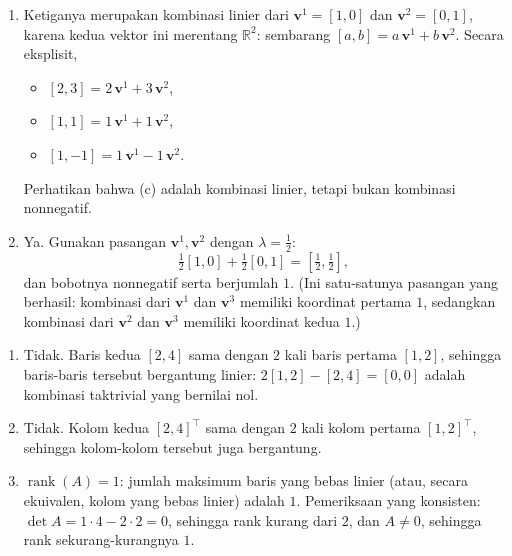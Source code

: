 \begin{enumerate}
\item Ketiganya merupakan kombinasi linier dari $\mathbf{v}^1 = [1,0]$ dan $\mathbf{v}^2 = [0,1]$, karena kedua vektor ini merentang $\mathbb{R}^2$: sembarang $[a, b] = a\,\mathbf{v}^1 + b\,\mathbf{v}^2$. Secara eksplisit,
\begin{itemize}
\item[(a)] $[2,3] = 2\,\mathbf{v}^1 + 3\,\mathbf{v}^2$,
\item[(b)] $[1,1] = 1\,\mathbf{v}^1 + 1\,\mathbf{v}^2$,
\item[(c)] $[1,-1] = 1\,\mathbf{v}^1 - 1\,\mathbf{v}^2$.
\end{itemize}
Perhatikan bahwa (c) adalah kombinasi linier, tetapi bukan kombinasi nonnegatif.
\item Ya. Gunakan pasangan $\mathbf{v}^1, \mathbf{v}^2$ dengan $\lambda = \tfrac12$:
\[
\tfrac12 [1, 0] + \tfrac12 [0, 1] = [\tfrac12, \tfrac12],
\]
dan bobotnya nonnegatif serta berjumlah $1$. (Ini satu-satunya pasangan yang berhasil: kombinasi dari $\mathbf{v}^1$ dan $\mathbf{v}^3$ memiliki koordinat pertama $1$, sedangkan kombinasi dari $\mathbf{v}^2$ dan $\mathbf{v}^3$ memiliki koordinat kedua $1$.)
\end{enumerate}

\begin{enumerate}
\item Tidak. Baris kedua $[2,4]$ sama dengan $2$ kali baris pertama $[1,2]$, sehingga baris-baris tersebut bergantung linier: $2[1,2] - [2,4] = [0,0]$ adalah kombinasi taktrivial yang bernilai nol.
\item Tidak. Kolom kedua $[2,4]^\top$ sama dengan $2$ kali kolom pertama $[1,2]^\top$, sehingga kolom-kolom tersebut juga bergantung.
\item $\operatorname{rank}(A) = 1$: jumlah maksimum baris yang bebas linier (atau, secara ekuivalen, kolom yang bebas linier) adalah $1$. Pemeriksaan yang konsisten: $\det A = 1\cdot 4 - 2 \cdot 2 = 0$, sehingga rank kurang dari $2$, dan $A \neq 0$, sehingga rank sekurang-kurangnya $1$.
\end{enumerate}


